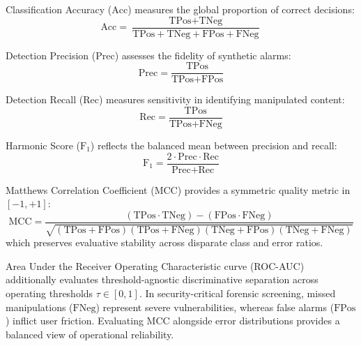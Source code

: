 \documentclass[conference]{IEEEtran}
\begin{document}
Classification Accuracy ($\text{Acc}$) measures the global proportion of correct decisions:
\begin{equation}
\text{Acc} = \frac{\text{TPos} + \text{TNeg}}{\text{TPos} + \text{TNeg} + \text{FPos} + \text{FNeg}}
\end{equation}

Detection Precision ($\text{Prec}$) assesses the fidelity of synthetic alarms:
\begin{equation}
\text{Prec} = \frac{\text{TPos}}{\text{TPos} + \text{FPos}}
\end{equation}

Detection Recall ($\text{Rec}$) measures sensitivity in identifying manipulated content:
\begin{equation}
\text{Rec} = \frac{\text{TPos}}{\text{TPos} + \text{FNeg}}
\end{equation}

Harmonic Score ($\text{F}_1$) reflects the balanced mean between precision and recall:
\begin{equation}
\text{F}_1 = \frac{2 \cdot \text{Prec} \cdot \text{Rec}}{\text{Prec} + \text{Rec}}
\end{equation}

Matthews Correlation Coefficient ($\text{MCC}$) provides a symmetric quality metric in $[-1, +1]$:
\begin{equation}
\text{MCC} = \frac{(\text{TPos} \cdot \text{TNeg}) - (\text{FPos} \cdot \text{FNeg})}{\sqrt{(\text{TPos} + \text{FPos})(\text{TPos} + \text{FNeg})(\text{TNeg} + \text{FPos})(\text{TNeg} + \text{FNeg})}}
\end{equation}
which preserves evaluative stability across disparate class and error ratios.

Area Under the Receiver Operating Characteristic curve (ROC-AUC) additionally evaluates threshold-agnostic discriminative separation across operating thresholds $\tau \in [0, 1]$. In security-critical forensic screening, missed manipulations ($\text{FNeg}$) represent severe vulnerabilities, whereas false alarms ($\text{FPos}$) inflict user friction. Evaluating $\text{MCC}$ alongside error distributions provides a balanced view of operational reliability.
\end{document}
